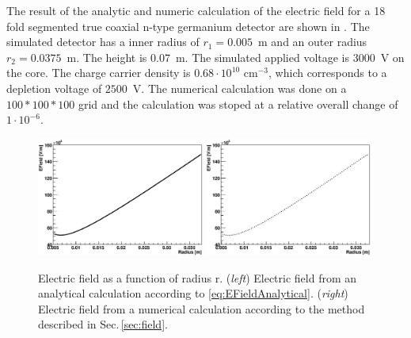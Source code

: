 The result of the analytic and numeric calculation of the electric field for a 18 fold segmented true coaxial n-type germanium detector are shown in . The simulated detector has a inner radius of $r_{1} = 0.005$~m and an outer radius $r_{2} = 0.0375$~m. The height is $0.07$~m. The simulated applied voltage is $3000$~V on the core. The charge carrier density is $0.68\cdot 10^{10} \text{~cm}^{-3}$, which corresponds to a depletion voltage of $2500$~V. The numerical calculation was done on a $100 \ast 100 \ast 100$ grid and the calculation was stoped at a relative overall change of $1 \cdot10^{-6}$. 
\begin{figure}
  \centering
  \includegraphics[width=0.49\textwidth]{EFieldAnalytical.eps}
  \includegraphics[width=0.49\textwidth]{EFieldNum.eps}
  \caption{Electric field as a function of radius r. (\emph{left}) Electric field from an analytical calculation according to \eqref{eq:EFieldAnalytical}. (\emph{right}) Electric field from a numerical calculation according to the method described in Sec.\,\ref{sec:field}. }
  \label{fig:efields}
\end{figure}

